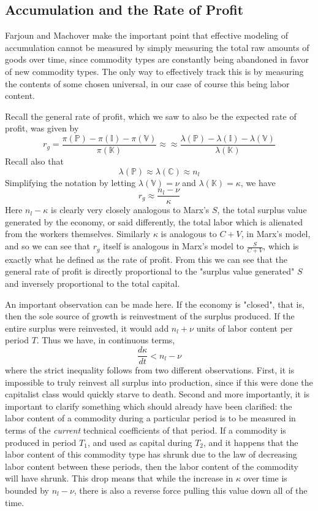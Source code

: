 \documentclass{article}
\theoremstyle{definition}
\theoremstyle{plain}
\theoremstyle{theorem}
\begin{document}
\subsection{Accumulation and the Rate of Profit}
Farjoun and Machover make the important point that effective modeling of accumulation cannot be measured by simply measuring the total raw amounts of goods over time, since commodity types are constantly being abandoned in favor of new commodity types. The only way to effectively track this is by measuring the contents of some chosen universal, in our case of course this being labor content. \par 
Recall the general rate of profit, which we saw to also be the expected rate of profit, was given by
\[  r_g = \frac{\pi(\mathbb{P}) - \pi(\mathbb{I}) - \pi(\mathbb{V})}{\pi(\mathbb{K})} \approx \approx \frac{\lambda(\mathbb{P}) - \lambda(\mathbb{I}) - \lambda(\mathbb{V})}{\lambda(\mathbb{K})}  \]
Recall also that 
\[ \lambda(\mathbb{P}) \approx \lambda(\mathbb{C}) \approx n_l \]
Simplifying the notation by letting $\lambda(\mathbb{V}) = \nu$ and $\lambda(\mathbb{K}) = \kappa$, we have
\[  r_g \approx \frac{n_l - \nu}{\kappa} \]
Here $n_l - \kappa$ is clearly very closely analogous to Marx's $S$, the total surplus value generated by the economy, or said differently, the total labor which is alienated from the workers themselves. Similarly $\kappa$ is analogous to $C+V$, in Marx's model, and so we can see that $r_g$ itself is analogous in Marx's model to $\frac{S}{C+V}$, which is exactly what he defined as the rate of profit. From this we can see that the general rate of profit is directly proportional to the "surplus value generated" $S$ and inversely proportional to the total capital. \par 
An important observation can be made here. If the economy is "closed", that is, then the sole source of growth is reinvestment of the surplus produced. If the entire surplus were reinvested, it would add $n_l+\nu$ units of labor content per period $T$. Thus we have, in continuous terms,
\[ \frac{d\kappa}{dt} < n_l-\nu \]
where the strict inequality follows from two different observations. First, it is impossible to truly reinvest all surplus into production, since if this were done the capitalist class would quickly starve to death. Second and more importantly, it is important to clarify something which should already have been clarified: the labor content of a commodity during a particular period is to be measured in terms of the \textit{current} technical coefficients of that period. If a commodity is produced in period $T_1$, and used as capital during $T_2$, and it happens that the labor content of this commodity type has shrunk due to the law of decreasing labor content between these periods, then the labor content of the commodity will have shrunk. This drop means that while the increase in $\kappa$ over time is bounded by $n_l-\nu$, there is also a reverse force pulling this value down all of the time. \par 
\end{document}
